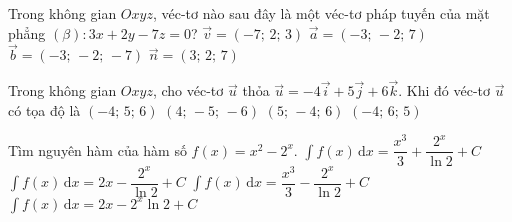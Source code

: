 \begin{ex}%
	Trong không gian $Oxyz$, véc-tơ nào sau đây là một véc-tơ pháp tuyến của mặt phẳng $\left(\beta \right) \colon 3x+2y-7z=0$?
	\choice
	{$\overrightarrow{v}=\left(-7;\, 2;\, 3\right)$}
	{\True $\overrightarrow{a}=\left(-3;\,-2;\, 7\right)$}
	{$\overrightarrow{b}=\left(-3;\,-2;\,- 7\right)$}
	{$\overrightarrow{n}=\left(3;\,2;\, 7\right)$}
\end{ex}
\begin{ex}%
	Trong không gian $Oxyz$, cho véc-tơ $\overrightarrow{u}$ thỏa $\overrightarrow{u}=-4\overrightarrow{i}+5\overrightarrow{j}+6\overrightarrow{k}$. Khi đó véc-tơ $\overrightarrow{u}$ có tọa độ là
	\choice
	{\True $\left(-4;\, 5;\, 6\right)$}
	{$\left(4;\,- 5;\,-6\right)$}
	{$\left(5;\,-4;\, 6\right)$}
	{$\left(-4;\, 6;\, 5\right)$}
\end{ex}
\begin{ex}%
	Tìm nguyên hàm của hàm số $f(x)=x^2-2^x$.
	\choice
	{$\displaystyle\int f(x) \mathrm{\,d}x=\dfrac{x^3}{3}+\dfrac{2^x}{\ln 2}+C$}
	{$\displaystyle\int f(x) \mathrm{\,d}x =2x-\dfrac{2^x}{\ln 2}+C$}
	{\True $\displaystyle\int f(x) \mathrm{\,d}x=\dfrac{x^3}{3}-\dfrac{2^x}{\ln 2}+C$}
	{$\displaystyle\int f(x) \mathrm{\,d}x=2x-2^x\ln 2+C$}
\end{ex}
